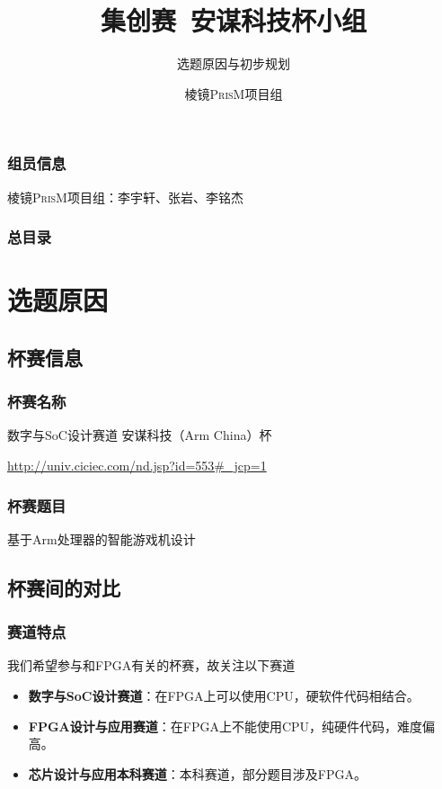 \documentclass[compress,aspectratio=169]{ctexbeamer}
\title{集创赛~安谋科技杯小组}
\subtitle{选题原因与初步规划}
\author{棱镜\textsc{PrisM}项目组}
\begin{document}
\begin{frame}
    \titlepage
\end{frame}

\begin{frame}
    \frametitle{组员信息}
    \begin{center}
        棱镜\textsc{PrisM}项目组：李宇轩、张岩、李铭杰
    \end{center}
\end{frame}

\begin{frame}
    \frametitle{总目录}
    \tableofcontents
\end{frame}

\section{选题原因}

\subsection{杯赛信息}

\begin{frame}[fragile]
    \frametitle{杯赛名称}
    \begin{center}
        \large
        数字与SoC设计赛道\qquad 
        安谋科技（Arm China）杯
    \end{center}\vspace{3ex}
    \begin{center}
        \url{http://univ.ciciec.com/nd.jsp?id=553#_jcp=1}
    \end{center}
\end{frame}

\begin{frame}
    \frametitle{杯赛题目}
    \begin{center}
        \large
        基于Arm处理器的智能游戏机设计
    \end{center}
\end{frame}

\subsection{杯赛间的对比}
\begin{frame}
    \frametitle{赛道特点}
    我们希望参与和FPGA有关的杯赛，故关注以下赛道
    \begin{itemize}
        \item \textbf{数字与SoC设计赛道}：在FPGA上可以使用CPU，硬软件代码相结合。
        \item \textbf{FPGA设计与应用赛道}：在FPGA上不能使用CPU，纯硬件代码，难度偏高。
        \item \textbf{芯片设计与应用本科赛道}：本科赛道，部分题目涉及FPGA。
    \end{itemize}
\end{frame}
\end{document}
